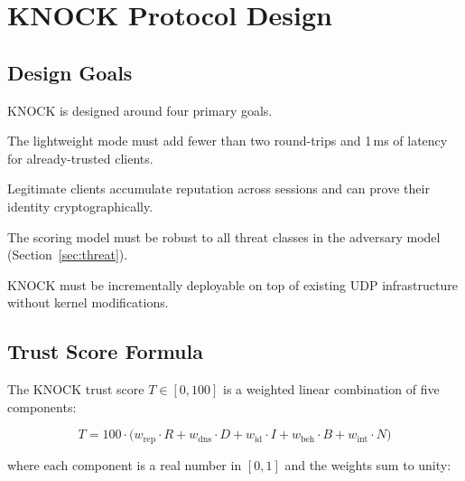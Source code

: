 \documentclass[10pt,conference]{IEEEtran}
\begin{document}
\section{KNOCK Protocol Design}
\label{sec:methodology}

\subsection{Design Goals}

KNOCK is designed around four primary goals.

\begin{description}[leftmargin=2em]
  \item[G1 — Efficiency.]  The lightweight mode must add fewer than
    two round-trips and 1\,ms of latency for already-trusted clients.

  \item[G2 — Identity continuity.]  Legitimate clients accumulate
    reputation across sessions and can prove their identity
    cryptographically.

  \item[G3 — Attack resistance.]  The scoring model must be robust to
    all threat classes in the adversary model (Section~\ref{sec:threat}).

  \item[G4 — Deployability.]  KNOCK must be incrementally deployable
    on top of existing UDP infrastructure without kernel modifications.
\end{description}

\subsection{Trust Score Formula}
\label{sec:formula}

The KNOCK trust score $T \in [0, 100]$ is a weighted linear combination
of five components:

\begin{equation}
  \label{eq:trust}
  T = 100 \cdot \bigl(
        w_{\mathrm{rep}} \cdot R
      + w_{\mathrm{dns}} \cdot D
      + w_{\mathrm{id}}  \cdot I
      + w_{\mathrm{beh}} \cdot B
      + w_{\mathrm{int}} \cdot N
      \bigr)
\end{equation}

\noindent
where each component is a real number in $[0, 1]$ and the weights
sum to unity:
\end{document}
